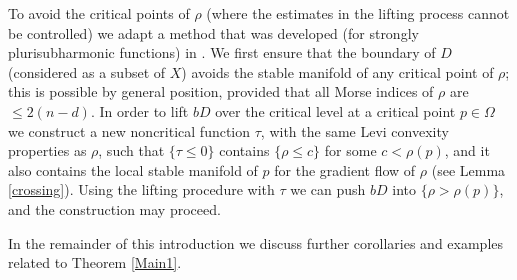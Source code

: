 \documentclass[11pt]{amsart}
\numberwithin{equation}{section}
\theoremstyle{definition}
\begin{document}
To avoid the critical points of $\rho$ (where the 
estimates in the lifting process cannot be controlled) 
we adapt a method that was developed 
(for strongly plurisubharmonic functions) in \cite{ACTA}. 
We first ensure that the boundary of $D$ (considered as a subset of $X$) 
avoids the stable manifold of any critical point of $\rho$; 
this is possible by general position, provided that all
Morse indices of $\rho$ are $\le 2(n-d)$. 
In order to lift $bD$ over the critical level at a critical point $p\in \Omega$ 
we construct a new noncritical function $\tau$, 
with the same Levi convexity properties as $\rho$, 
such that $\{\tau \le 0\}$ contains $\{\rho \le c\}$ for some $c<\rho(p)$,
and it also contains the local stable manifold of $p$ for the gradient flow of $\rho$
(see Lemma \ref{crossing}). Using the lifting procedure 
with $\tau$ we can push $bD$ into $\{\rho>\rho(p)\}$,
and the construction may proceed. 

In the remainder of this introduction we discuss 
further corollaries and examples related to Theorem \ref{Main1}.
 
\end{document}
